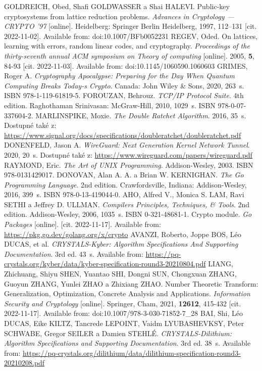 \begin{thebibliography}{99}
  GOLDREICH, Obed, Shafi GOLDWASSER a Shai HALEVI. Public-key cryptosystems from lattice reduction problems. \textit{Advances in Cryptology --- CRYPTO '97} [online]. Heidelberg: Springer Berlin Heidelberg, 1997, 112--131 [cit. 2022-11-02]. Available from: doi:10.1007/BFb0052231
  REGEV, Oded. On lattices, learning with errors, random linear codes, and cryptography. \textit{Proceedings of the thirty-seventh annual ACM symposium on Theory of computing} [online]. 2005, \textbf{5}, 84-93 [cit. 2022-11-03]. Available from: doi:10.1145/1060590.1060603
  GRIMES, Roger A. \textit{Cryptography Apocalypse: Preparing for the Day When Quantum Computing Breaks Today-s Crypto}. Canada: John Wiley \& Sons, 2020, 263~s. ISBN 978-1-119-61819-5.
  FOROUZAN, Behrouz. \textit{TCP/IP Protocol Suite}. 4th edition. Raghothaman Srinivasan: McGraw-Hill, 2010, 1029~s. ISBN 978-0-07-337604-2.
  MARLINSPIKE, Moxie. \textit{The Double Ratchet Algorithm}. 2016, 35~s. Dostupné také z: \url{https://www.signal.org/docs/specifications/doubleratchet/doubleratchet.pdf}
  DONENFELD, Jason A. \textit{WireGuard: Next Generation Kernel Network Tunnel}. 2020, 20~s. Dostupné také z: \url{https://www.wireguard.com/papers/wireguard.pdf}
  RAYMOND, Eric. \textit{The Art of UNIX Programming}. Addison-Wesley, 2003. ISBN 978-0131429017.
  DONOVAN, Alan A. A. a Brian W. KERNIGHAN. \textit{The Go Programming Language}. 2nd edition. Crawfordsville, Indiana: Addison-Wesley, 2016, 399~s. ISBN 978-0-13-419044-0.
  AHO, Alfred V., Monica S. LAM, Ravi SETHI a Jeffrey D. ULLMAN. \textit{Compilers Principles, Techniques, \& Tools}. 2nd edition. Addison-Wesley, 2006, 1035~s. ISBN 0-321-48681-1.
  Crypto module. \textit{Go Packages} [online]. [cit. 2022-11-17]. Available from: \url{https://pkg.go.dev/golang.org/x/crypto}
  AVANZI, Roberto, Joppe BOS, Léo DUCAS, et al. \textit{CRYSTALS-Kyber: Algorithm Specifications And Supporting Documentation}. 3rd ed. 43~s. Available from: \url{https://pq-crystals.org/kyber/data/kyber-specification-round3-20210804.pdf}
  LIANG, Zhichuang, Shiyu SHEN, Yuantao SHI, Dongni SUN, Chongxuan ZHANG, Guoyun ZHANG, Yunlei ZHAO a Zhixiang ZHAO. Number Theoretic Transform: Generalization, Optimization, Concrete Analysis and Applications. \textit{Information Security and Cryptology} [online]. Springer, Cham, 2021, \textbf{12612}, 415-432 [cit. 2022-11-17]. Available from: doi:10.1007/978-3-030-71852-7\_28
  BAI, Shi, Léo DUCAS, Eike KILTZ, Tancrede LEPOINT, Vaidm LYUBASHEVKSY, Peter SCHWABE, Gregor SEILER a Damien STEHLÉ. \textit{CRYSTALS-Dilithium: Algorithm Specifications and Supporting Documentation}. 3rd ed. 38~s. Available from: \url{https://pq-crystals.org/dilithium/data/dilithium-specification-round3-20210208.pdf}


\end{thebibliography}

